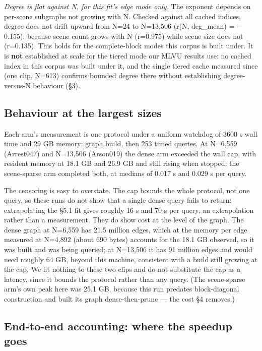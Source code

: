 \documentclass[sigconf,review,anonymous]{acmart}
\begin{document}
\emph{Degree is flat against N, for this fit's edge mode only.} The exponent depends on per-scene
subgraphs not growing with N. Checked against all cached indices, degree does not drift
upward from N=24 to N=13,506 (r(N, deg\_mean) = \ensuremath{-}0.155), because scene count grows with N
(r=0.975) while scene size does not (r=0.135). This holds for the complete-block modes this
corpus is built under. It is \textbf{not} established at scale for the tiered mode our MLVU
results use: no cached index in this corpus was built under it, and the single tiered cache
measured since (one clip, N=613) confirms bounded degree there without establishing
degree-versus-N behaviour (§3).

\subsection{Behaviour at the largest sizes}

Each arm's measurement is one protocol under a uniform watchdog of 3600 s wall time and 29 GB
memory: graph build, then 253 timed queries. At N=6,559 (Arrest047) and N=13,506 (Arson019)
the dense arm exceeded the wall cap, with resident memory at 18.1 GB and 26.9 GB and still
rising when stopped; the scene-sparse arm completed both, at medians of 0.017 s and 0.029 s
per query.

The censoring is easy to overstate. The cap bounds the whole protocol, not one query, so these
runs do not show that a single dense query fails to return: extrapolating the §5.1 fit gives
roughly 16 s and 70 s per query, an extrapolation rather than a measurement. They do show cost
at the level of the graph. The dense graph at N=6,559 has 21.5 million edges, which at the
memory per edge measured at N=4,892 (about 690 bytes) accounts for the 18.1 GB observed, so it
was built and was being queried; at N=13,506 it has 91 million edges and would need roughly
64 GB, beyond this machine, consistent with a build still growing at the cap. We fit nothing to
these two clips and do not substitute the cap as a latency, since it bounds the protocol rather
than any query. (The scene-sparse arm's own peak here was 25.1 GB, because this run predates
block-diagonal construction and built its graph dense-then-prune --- the cost §4 removes.)

\subsection{End-to-end accounting: where the speedup goes}
\end{document}
